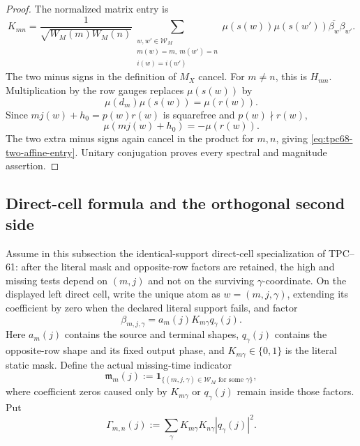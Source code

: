 \begin{proof}
The normalized matrix entry is
\[
 K_{mn}
 =
 \frac1{\sqrt{W_M(m)W_M(n)}}
 \sum_{\substack{w,w'\in\mathcal W_M\\
                 m(w)=m,\ m(w')=n\\
                 i(w)=i(w')}}
 \mu(s(w))\mu(s(w'))
 \overline{\beta_w}\beta_{w'}.
\]
The two minus signs in the definition of \(M_X\) cancel.  For \(m\ne n\),
this is \(H_{mn}\).  Multiplication by the row gauges replaces
\(\mu(s(w))\) by
\[
 \mu(d_m)\mu(s(w))
 =\mu(r(w)).
\]
Since \(mj(w)+h_0=p(w)r(w)\) is squarefree and
\(p(w)\nmid r(w)\),
\[
 \mu(mj(w)+h_0)=-\mu(r(w)).
\]
The two extra minus signs again cancel in the product for \(m,n\), giving
\eqref{eq:tpc68-two-affine-entry}.  Unitary conjugation proves every
spectral and magnitude assertion.
\end{proof}

\subsection{Direct-cell formula and the orthogonal second side}

Assume in this subsection the identical-support direct-cell specialization
of TPC--61: after the literal mask and opposite-row factors are retained,
the high and missing tests depend on \((m,j)\) and not on the surviving
\(\gamma\)-coordinate.  On the displayed left direct cell, write the unique atom as
\(w=(m,j,\gamma)\), extending its coefficient by zero when the declared
literal support fails, and factor
\begin{equation}
 \beta_{m,j,\gamma}
 =a_m(j)K_{m\gamma}q_\gamma(j).
 \label{eq:tpc68-direct-cell-factorization}
\end{equation}
Here \(a_m(j)\) contains the source and terminal shapes,
\(q_\gamma(j)\) contains the opposite-row shape and its fixed output phase,
and \(K_{m\gamma}\in\{0,1\}\) is the literal static mask.  Define the
actual missing-time indicator
\begin{equation}
 \mathfrak m_m(j)
 :=
 \mathbf1_{\{(m,j,\gamma)\in\mathcal W_M
                 \text{ for some }\gamma\}},
 \label{eq:tpc68-missing-time-indicator}
\end{equation}
where coefficient zeros caused only by \(K_{m\gamma}\) or
\(q_\gamma(j)\) remain inside those factors.  Put
\begin{equation}
 \Gamma_{m,n}(j)
 :=
 \sum_\gamma
 K_{m\gamma}K_{n\gamma}|q_\gamma(j)|^2.
 \label{eq:tpc68-Gamma-overlap}
\end{equation}

